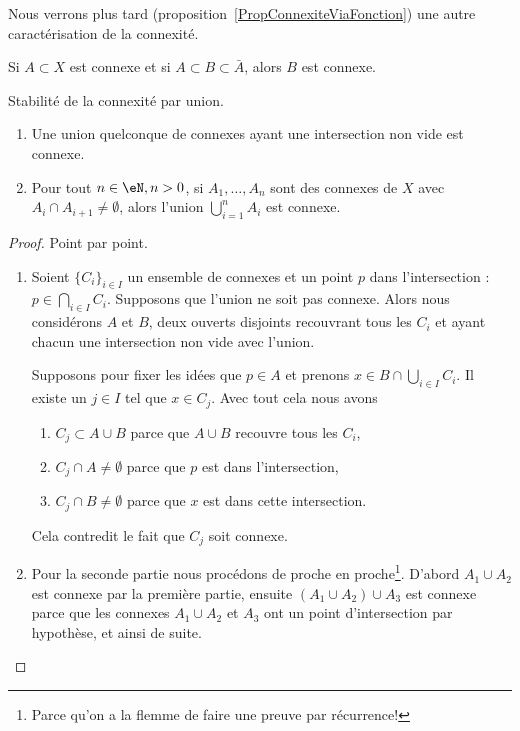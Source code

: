 Nous verrons plus tard (proposition~\ref{PropConnexiteViaFonction}) une autre caractérisation de la connexité.

\begin{proposition}     \label{PROPooSCKNooRbewdv}
    Si \( A\subset X\) est connexe et si \( A\subset B\subset \bar A\), alors \( B\) est connexe.
\end{proposition}

\begin{proposition} \label{PropIWIDzzH}
    Stabilité de la connexité par union.
    \begin{enumerate}
        \item       \label{ITEMooLVSSooTGstBz}
    Une union quelconque de connexes ayant une intersection non vide est connexe.
\item
    Pour tout \( n \in \eN, n > 0 \), si \( A_1,\ldots, A_n\) sont des connexes de \( X\) avec \( A_i\cap A_{i+1}\neq \emptyset\), alors l'union \( \bigcup_{i=1}^nA_i\) est connexe.
    \end{enumerate}
\end{proposition}

\begin{proof}
    Point par point.
    \begin{enumerate}
        \item
    Soient \( \{ C_i \}_{i\in I}\) un ensemble de connexes et un point \( p\) dans l'intersection : \( p\in\bigcap_{i\in I}C_i\). Supposons que l'union ne soit pas connexe. Alors nous considérons \( A\) et \( B\), deux ouverts disjoints recouvrant tous les \( C_i\) et ayant chacun une intersection non vide avec l'union.

    Supposons pour fixer les idées que \( p\in A\) et prenons \( x\in B\cap\bigcup_{i\in I}C_i\). Il existe un \( j\in I\) tel que \( x\in C_j\). Avec tout cela nous avons
    \begin{enumerate}
        \item
            \( C_j\subset A\cup B\) parce que \(A \cup B\) recouvre tous les \( C_i \),
        \item
            \( C_j\cap A\neq \emptyset\) parce que \( p\) est dans l'intersection,
        \item
            \( C_j\cap B\neq\emptyset\) parce que \( x\) est dans cette intersection.
    \end{enumerate}
    Cela contredit le fait que \( C_j\) soit connexe.

\item

    Pour la seconde partie nous procédons de proche en proche\footnote{Parce qu'on a la flemme de faire une preuve par récurrence!}. D'abord \( A_1\cup A_2\) est connexe par la première partie, ensuite \( (A_1\cup A_2)\cup A_3\) est connexe parce que les connexes \( A_1\cup A_2\) et \( A_3\) ont un point d'intersection par hypothèse, et ainsi de suite.
    \end{enumerate}
\end{proof}



